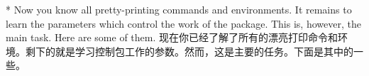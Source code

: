 \begin{paracol}{2}
\switchcolumn[0]*%
Now you know all pretty-printing commands and environments. It remains
to learn the parameters which control the work of the 
package. This is, however, the main task. Here are some of them.
\switchcolumn
现在你已经了解了所有的漂亮打印命令和环境。剩下的就是学习控制包工作的参数。然而，这是主要的任务。下面是其中的一些。
\end{paracol}